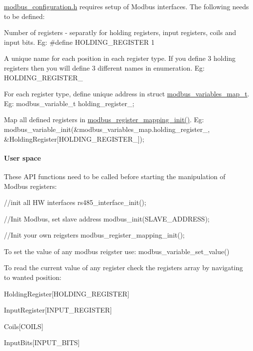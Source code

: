 {\ttfamily \mbox{\hyperlink{modbus__configuration_8h}{modbus\+\_\+configuration.\+h}}} requires setup of Modbus interfaces. The following needs to be defined\+:
\begin{DoxyItemize}
\item Number of registers -\/ separatly for holding registers, input registers, coils and input bits. Eg\+: {\ttfamily \#define H\+O\+L\+D\+I\+N\+G\+\_\+\+R\+E\+G\+I\+S\+T\+ER 1}
\item A unique name for each position in each register type. If you define 3 holding registers then you will define 3 different names in enumeration. Eg\+: {\ttfamily H\+O\+L\+D\+I\+N\+G\+\_\+\+R\+E\+G\+I\+S\+T\+E\+R\+\_}
\item For each register type, define unique address in struct \mbox{\hyperlink{structmodbus__variables__map__t}{modbus\+\_\+variables\+\_\+map\+\_\+t}}. Eg\+: {\ttfamily modbus\+\_\+variable\+\_\+t holding\+\_\+register\+\_;}
\item Map all defined registers in \mbox{\hyperlink{group___insert_ga6dbaaf108ca00d5dfd1037aadfc10f6f}{modbus\+\_\+register\+\_\+mapping\+\_\+init()}}. Eg\+: {\ttfamily modbus\+\_\+variable\+\_\+init(\&modbus\+\_\+variables\+\_\+map.\+holding\+\_\+register\+\_, \&Holding\+Register\mbox{[}H\+O\+L\+D\+I\+N\+G\+\_\+\+R\+E\+G\+I\+S\+T\+E\+R\+\_\mbox{]});}
\end{DoxyItemize}

\paragraph*{User space}

These A\+PI functions need to be called before starting the manipulation of Modbus registers\+: 
\begin{DoxyCode}
//init all HW interfaces
rs485\_interface\_init();

//Init Modbus, set slave address
modbus\_init(SLAVE\_ADDRESS);

//Init your own reigsters
modbus\_register\_mapping\_init();
\end{DoxyCode}


To set the value of any modbus reigster use\+: {\ttfamily modbus\+\_\+variable\+\_\+set\+\_\+value()}

To read the current value of any register check the register\textquotesingle{}s array by navigating to wanted position\+:
\begin{DoxyItemize}
\item Holding\+Register\mbox{[}H\+O\+L\+D\+I\+N\+G\+\_\+\+R\+E\+G\+I\+S\+T\+ER\mbox{]}
\item Input\+Register\mbox{[}I\+N\+P\+U\+T\+\_\+\+R\+E\+G\+I\+S\+T\+ER\mbox{]}
\item Coils\mbox{[}C\+O\+I\+LS\mbox{]}
\item Input\+Bits\mbox{[}I\+N\+P\+U\+T\+\_\+\+B\+I\+TS\mbox{]} 
\end{DoxyItemize}